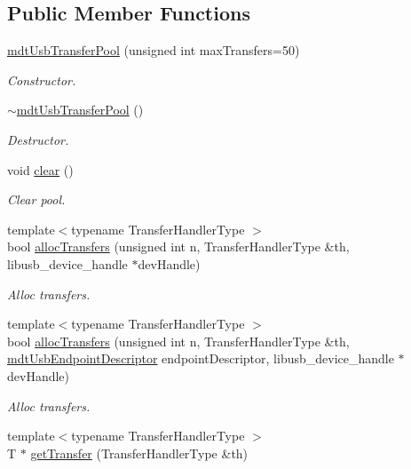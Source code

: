 \subsection*{Public Member Functions}
\begin{DoxyCompactItemize}
\item 
\hyperlink{classmdt_usb_transfer_pool_ae2585ccc5070312b3c058c3b6bc0e8a8}{mdt\-Usb\-Transfer\-Pool} (unsigned int max\-Transfers=50)
\begin{DoxyCompactList}\small\item\em Constructor. \end{DoxyCompactList}\item 
\hyperlink{classmdt_usb_transfer_pool_ac7e18c464fa80970b75b995f99febb25}{$\sim$mdt\-Usb\-Transfer\-Pool} ()
\begin{DoxyCompactList}\small\item\em Destructor. \end{DoxyCompactList}\item 
void \hyperlink{classmdt_usb_transfer_pool_a6b45f8033b32683aef4f026e31160082}{clear} ()
\begin{DoxyCompactList}\small\item\em Clear pool. \end{DoxyCompactList}\item 
{\footnotesize template$<$typename Transfer\-Handler\-Type $>$ }\\bool \hyperlink{classmdt_usb_transfer_pool_a0da3432347b16aa2dee9ab7fb5fd6ddc}{alloc\-Transfers} (unsigned int n, Transfer\-Handler\-Type \&th, libusb\-\_\-device\-\_\-handle $\ast$dev\-Handle)
\begin{DoxyCompactList}\small\item\em Alloc transfers. \end{DoxyCompactList}\item 
{\footnotesize template$<$typename Transfer\-Handler\-Type $>$ }\\bool \hyperlink{classmdt_usb_transfer_pool_a1f37ff1c8ebe2a62acc11232f7f19166}{alloc\-Transfers} (unsigned int n, Transfer\-Handler\-Type \&th, \hyperlink{classmdt_usb_endpoint_descriptor}{mdt\-Usb\-Endpoint\-Descriptor} endpoint\-Descriptor, libusb\-\_\-device\-\_\-handle $\ast$dev\-Handle)
\begin{DoxyCompactList}\small\item\em Alloc transfers. \end{DoxyCompactList}\item 
{\footnotesize template$<$typename Transfer\-Handler\-Type $>$ }\\T $\ast$ \hyperlink{classmdt_usb_transfer_pool_a941436df0356fce84f8706169e3f3c81}{get\-Transfer} (Transfer\-Handler\-Type \&th)

\end{DoxyCompactItemize}
